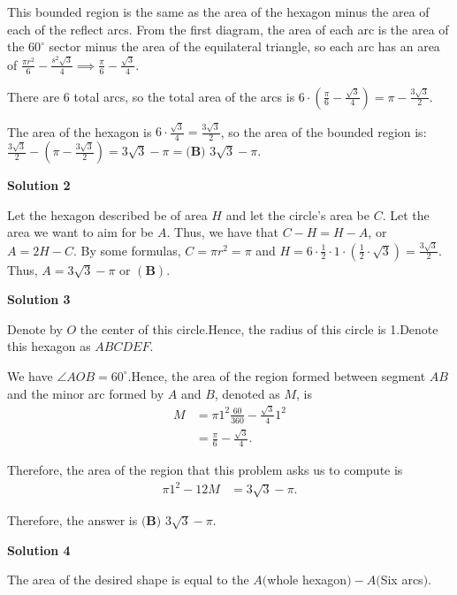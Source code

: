 \begin{enumerate}
 This bounded region is the same as the area of the hexagon minus the area of each of the reflect arcs. From the first diagram, the area of each arc is the area of the $60^{\circ}$ sector minus the area of the equilateral triangle, so each arc has an area of $\frac{\pi r^2}{6} - \frac{s^2\sqrt{3}}{4} \implies \frac{\pi}{6} - \frac{\sqrt{3}}{4}$.

 There are 6 total arcs, so the total area of the arcs is $6\cdot (\frac{\pi}{6} - \frac{\sqrt{3}}{4}) = \pi - \frac{3\sqrt{3}}{2}$.

 The area of the hexagon is $6\cdot \frac{\sqrt{3}}{4} = \frac{3\sqrt{3}}{2}$, so the area of the bounded region is:$\frac{3\sqrt{3}}{2} - (\pi - \frac{3\sqrt{3}}{2}) = 3\sqrt{3} - \pi = \boxed{\textbf{(B) }3 \sqrt{3} - \pi}$.

 



\textbf{Solution 2}

Let the hexagon described be of area $H$ and let the circle's area be $C$. Let the area we want to aim for be $A$. Thus, we have that $C-H=H-A$, or $A=2H-C$. By some formulas, $C=\pi{r}^2=\pi$ and $H=6\cdot\frac12\cdot1\cdot(\frac12\cdot\sqrt3)=\frac{3\sqrt3}2$. Thus, $A=3\sqrt3-\pi$ or $\boxed{(\textbf{B})}$.

 



\textbf{Solution 3}

Denote by $O$ the center of this circle.Hence, the radius of this circle is 1.Denote this hexagon as $ABCDEF$.

 We have $\angle AOB = 60^\circ$.Hence, the area of the region formed between segment $AB$ and the minor arc formed by $A$ and $B$, denoted as $M$, is
 \begin{align*} M & = \pi 1^2 \frac{60}{360} - \frac{\sqrt{3}}{4} 1^2 \\ & = \frac{\pi}{6} - \frac{\sqrt{3}}{4} . \end{align*}


 Therefore, the area of the region that this problem asks us to compute is
 \begin{align*} \pi 1^2 - 12 M & = 3 \sqrt{3} - \pi . \end{align*}


 Therefore, the answer is $\boxed{\textbf{(B) }3 \sqrt{3} - \pi}$.

 



\textbf{Solution 4}

The area of the desired shape is equal to the $A($whole hexagon$)-A($Six arcs$).$ 


\end{enumerate}

